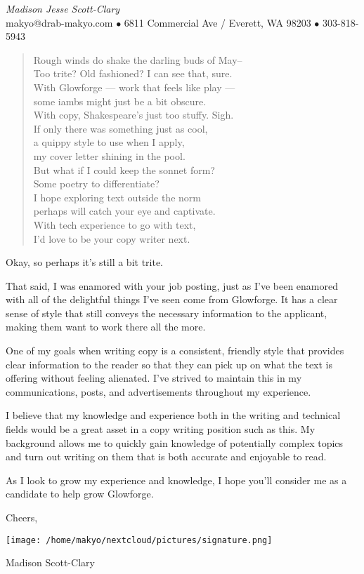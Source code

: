 \documentclass[letterpaper]{memoir}
\begin{document}
\begin{center}
  {\huge \textit{\color{titlegreydark} Madison Jesse Scott-Clary}}\\
  {\color{titlegreydark} makyo@drab-makyo.com $\bullet$ 6811 Commercial Ave / Everett, WA 98203 $\bullet$ 303-818-5943}
\end{center}

\begin{verse}
Rough winds do shake the darling buds of May--\\
\vin Too trite? Old fashioned? I can see that, sure.\\
With Glowforge --- work that feels like play ---\\
\vin some iambs might just be a bit obscure.\\
With copy, Shakespeare's just too stuffy. Sigh.\\
\vin If only there was something just as cool,\\
a quippy style to use when I apply,\\
\vin my cover letter shining in the pool.\\
But what if I could keep the sonnet form?\\
\vin Some poetry to differentiate?\\
I hope exploring text outside the norm\\
\vin perhaps will catch your eye and captivate.\\
\vin \vin With tech experience to go with text,\\
\vin \vin I'd love to be your copy writer next.
\end{verse}

Okay, so perhaps it's still a bit trite.

That said, I was enamored with your job posting, just as I've been enamored with all of the delightful things I've seen come from Glowforge. It has a clear sense of style that still conveys the necessary information to the applicant, making them want to work there all the more.

One of my goals when writing copy is a consistent, friendly style that provides clear information to the reader so that they can pick up on what the text is offering without feeling alienated. I've strived to maintain this in my communications, posts, and advertisements throughout my experience.

I believe that my knowledge and experience both in the writing and technical fields would be a great asset in a copy writing position such as this. My background allows me to quickly gain knowledge of potentially complex topics and turn out writing on them that is both accurate and enjoyable to read.

As I look to grow my experience and knowledge, I hope you'll consider me as a candidate to help grow Glowforge.

\vspace{0.5cm}

\noindent Cheers,

\texttt{[image: /home/makyo/nextcloud/pictures/signature.png]}

\noindent Madison Scott-Clary
\end{document}
